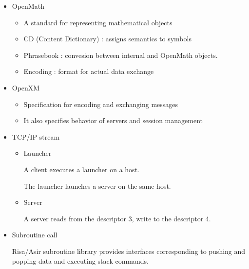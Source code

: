 \begin{slide}{}

\begin{itemize}
\item OpenMath

\begin{itemize}
\item A standard for representing mathematical objects

\item CD (Content Dictionary) : assigns semantics to symbols

\item Phrasebook : convesion between internal and OpenMath objects.

\item Encoding : format for actual data exchange
\end{itemize}

\item OpenXM

\begin{itemize}
\item Specification for encoding and exchanging messages

\item It also specifies behavior of servers and session management
\end{itemize}

\end{itemize}
\end{slide}

\begin{slide}{}

\begin{itemize}
\item TCP/IP stream

\begin{itemize}
\item Launcher

A client executes a launcher on a host.

The launcher launches a server on the same host.

\item Server

A server reads from the descriptor 3, write to the descriptor 4.

\end{itemize}

\item Subroutine call

Risa/Asir subroutine library provides interfaces corresponding to
pushing and popping data and executing stack commands.
\end{itemize}
\end{slide}

